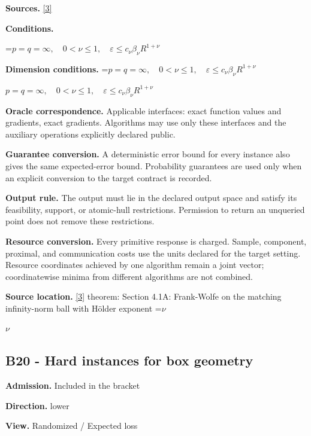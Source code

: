 \documentclass[10pt,a4paper]{article}
\newcommand{\AtlasMath}[1]{\par\begingroup\centering\setbox0=\hbox{$\displaystyle #1$}\ifdim\wd0>1.4\linewidth\typeout{ATLAS WIDE FORMULA: \the\wd0}\fi\ifdim\wd0>\linewidth\resizebox{\linewidth}{!}{\box0}\else\box0\fi\par\endgroup}
\newcommand{\AtlasInlineMath}[1]{\begingroup\setbox0=\hbox{$#1$}\ifdim\wd0>.4\linewidth\endgroup\AtlasMath{#1}\else\endgroup$#1$\fi}
\begin{document}
\textbf{Sources.} \href{https://arxiv.org/pdf/1307.5001}{[3]}



\textbf{Conditions.}
\AtlasMath{p=q=\infty,\quad0<\nu\le1,\quad\varepsilon\le c_\nu\beta_\nu R^{1+\nu}}




\textbf{Dimension conditions.} \AtlasInlineMath{p=q=\infty,\quad0<\nu\le1,\quad\varepsilon\le c_\nu\beta_\nu R^{1+\nu}}



\textbf{Oracle correspondence.} Applicable interfaces: exact function values and gradients, exact gradients. Algorithms may use only these interfaces and the auxiliary operations explicitly declared public.



\textbf{Guarantee conversion.} A deterministic error bound for every instance also gives the same expected-error bound. Probability guarantees are used only when an explicit conversion to the target contract is recorded.



\textbf{Output rule.} The output must lie in the declared output space and satisfy its feasibility, support, or atomic-hull restrictions. Permission to return an unqueried point does not remove these restrictions.



\textbf{Resource conversion.} Every primitive response is charged. Sample, component, proximal, and communication costs use the units declared for the target setting. Resource coordinates achieved by one algorithm remain a joint vector; coordinatewise minima from different algorithms are not combined.



\textbf{Source location.} \href{https://arxiv.org/pdf/1307.5001}{[3]} theorem: Section 4.1A: Frank-Wolfe on the matching infinity-norm ball with Hölder exponent \AtlasInlineMath{\nu}



\subsection{B20 - Hard instances for box geometry}


\textbf{Admission.} Included in the bracket



\textbf{Direction.} lower



\textbf{View.} Randomized / Expected loss
\end{document}
